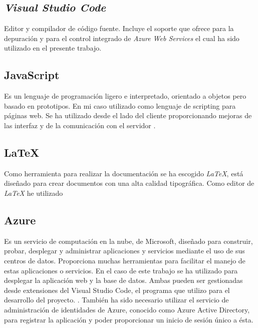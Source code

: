 \subsection{\textit{Visual Studio Code}}
Editor y compilador de código fuente. Incluye el soporte que ofrece para la depuración y para el control integrado de \textit{Azure Web Services} el cual ha sido utilizado en el presente trabajo.



\subsection{JavaScript}
Es un lenguaje de programación ligero e interpretado, orientado a objetos pero basado en prototipos. En mi caso utilizado como lenguaje de scripting para páginas web. Se ha utilizado desde el lado del cliente proporcionando mejoras de las interfaz y de la comunicación con el servidor \cite{wiki:javascript}.



\subsection{LaTeX}
Como herramienta para realizar la documentación se ha escogido \textit{LaTeX}, está diseñado para crear documentos con una alta calidad tipográfica. Como editor de \textit{LaTeX} he utilizado 

\subsection{Azure}
Es un servicio de computación en la nube, de Microsoft, diseñado para construir, probar, desplegar y administrar aplicaciones y servicios mediante el uso de sus centros de datos. Proporciona muchas herramientas para facilitar el manejo de estas aplicaciones o servicios. En el caso de este trabajo se ha utilizado para desplegar la aplicación web y la base de datos. Ambas pueden ser gestionadas desde extensiones del Visual Studio Code, el programa que utilizo para el desarrollo del proyecto. \cite{wiki:azure}.\newline
También ha sido necesario utilizar el servicio de administración de identidades de Azure, conocido como Azure Active Directory, para registrar la aplicación y poder proporcionar un inicio de sesión único a ésta.

